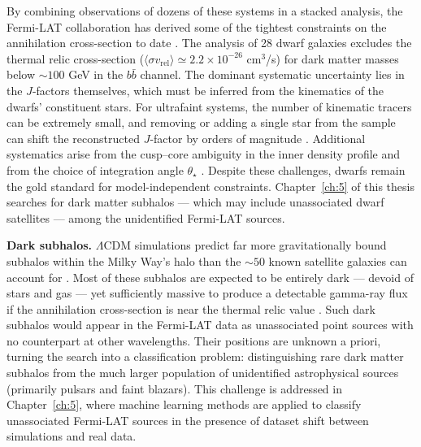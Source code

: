 By combining observations of dozens of these systems in a stacked analysis, the Fermi-LAT collaboration has derived some of the tightest constraints on the annihilation cross-section to date \cite{Fermi-LAT:2015att,Hooper:2024}.
The analysis of 28 dwarf galaxies excludes the thermal relic cross-section ($\langle \sigma v_\text{rel} \rangle \simeq 2.2 \times 10^{-26}$ cm$^3$/s) for dark matter masses below $\sim 100$ GeV in the $b\bar{b}$ channel.
The dominant systematic uncertainty lies in the $J$-factors themselves, which must be inferred from the kinematics of the dwarfs' constituent stars.
For ultrafaint systems, the number of kinematic tracers can be extremely small, and removing or adding a single star from the sample can shift the reconstructed $J$-factor by orders of magnitude \cite{Cirelli:2024ssz}.
Additional systematics arise from the cusp--core ambiguity in the inner density profile and from the choice of integration angle $\theta_\star$ \cite{Cirelli:2024ssz}.
Despite these challenges, dwarfs remain the gold standard for model-independent constraints.
Chapter~\ref{ch:5} of this thesis searches for dark matter subhalos --- which may include unassociated dwarf satellites --- among the unidentified Fermi-LAT sources.

\textbf{Dark subhalos.} $\Lambda$CDM simulations predict far more gravitationally bound subhalos within the Milky Way's halo than the $\sim 50$ known satellite galaxies can account for \cite{Cirelli:2024ssz}.
Most of these subhalos are expected to be entirely dark --- devoid of stars and gas --- yet sufficiently massive to produce a detectable gamma-ray flux if the annihilation cross-section is near the thermal relic value \cite{Cirelli:2024ssz}.
Such dark subhalos would appear in the Fermi-LAT data as unassociated point sources with no counterpart at other wavelengths.
Their positions are unknown a priori, turning the search into a classification problem: distinguishing rare dark matter subhalos from the much larger population of unidentified astrophysical sources (primarily pulsars and faint blazars).
This challenge is addressed in Chapter~\ref{ch:5}, where machine learning methods are applied to classify unassociated Fermi-LAT sources in the presence of dataset shift between simulations and real data.

